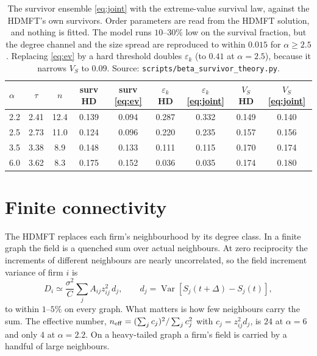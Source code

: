\documentclass[11pt]{article}
\newcommand{\Var}{\operatorname{Var}}
\theoremstyle{remark}
\begin{document}
\begin{table}[h]
\centering
\small\setlength{\tabcolsep}{4pt}
\begin{tabular}{lcc|cc|cc|cc}
\toprule
$\alpha$ & $\tau$ & $n$ & surv HD & surv \eqref{eq:ev} & $\varepsilon_k$ HD & $\varepsilon_k$
 \eqref{eq:joint} & $V_S$ HD & $V_S$ \eqref{eq:joint}\\
\midrule
2.2 & 2.41 & 12.4 & 0.139 & 0.094 & 0.287 & 0.332 & 0.149 & 0.140\\
2.5 & 2.73 & 11.0 & 0.124 & 0.096 & 0.220 & 0.235 & 0.157 & 0.156\\
3.5 & 3.38 & 8.9 & 0.148 & 0.133 & 0.111 & 0.115 & 0.170 & 0.174\\
6.0 & 3.62 & 8.3 & 0.175 & 0.152 & 0.036 & 0.035 & 0.174 & 0.180\\
\bottomrule
\end{tabular}
\caption{The survivor ensemble \eqref{eq:joint} with the extreme-value survival law, against
the HDMFT's own survivors.  Order parameters are read from the HDMFT solution, and nothing is
fitted.  The model runs $10$--$30\%$ low on the survival fraction, but the degree channel and
the size spread are reproduced to within $0.015$ for $\alpha\ge2.5$.  Replacing \eqref{eq:ev}
by a hard threshold doubles $\varepsilon_k$ (to $0.41$ at $\alpha=2.5$), because it narrows
$V_S$ to $0.09$.  Source: \texttt{scripts/beta\_survivor\_theory.py}.}
\label{tab:ensemble}
\end{table}

\section{Finite connectivity}
\label{sec:finiteC}

The HDMFT replaces each firm's neighbourhood by its degree class.  In a finite graph the field
is a quenched sum over actual neighbours.  At zero reciprocity the increments of different
neighbours are nearly uncorrelated, so the field increment variance of firm $i$ is
\begin{equation}
  D_i\simeq\frac{\sigma^2}{C}\sum_jA_{ij}z_{ij}^2\,d_j,
  \qquad d_j=\Var[S_j(t+\Delta)-S_j(t)],
  \label{eq:nbrsum}
\end{equation}
to within $1$--$5\%$ on every graph.  What matters is how few neighbours carry the sum.  The
effective number, $n_{\rm eff}=(\sum_jc_j)^2/\sum_jc_j^2$ with $c_j=z_{ij}^2d_j$, is $24$ at
$\alpha=6$ and only $4$ at $\alpha=2.2$.  On a heavy-tailed graph a firm's field is carried by a
handful of large neighbours.
\end{document}
